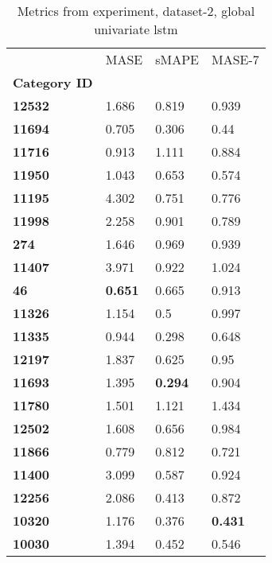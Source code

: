\begin{table}[H]
\centering
\caption{Metrics from experiment, dataset-2, global univariate lstm}
\label{table:global-univariate-lstm-dataset-2}
\begin{tabular}{llll}
\toprule
{} &            MASE &           sMAPE &          MASE-7 \\
\textbf{Category ID} &                 &                 &                 \\
\midrule
\textbf{12532      } &           1.686 &           0.819 &           0.939 \\
\textbf{11694      } &           0.705 &           0.306 &            0.44 \\
\textbf{11716      } &           0.913 &           1.111 &           0.884 \\
\textbf{11950      } &           1.043 &           0.653 &           0.574 \\
\textbf{11195      } &           4.302 &           0.751 &           0.776 \\
\textbf{11998      } &           2.258 &           0.901 &           0.789 \\
\textbf{274        } &           1.646 &           0.969 &           0.939 \\
\textbf{11407      } &           3.971 &           0.922 &           1.024 \\
\textbf{46         } &  \textbf{0.651} &           0.665 &           0.913 \\
\textbf{11326      } &           1.154 &             0.5 &           0.997 \\
\textbf{11335      } &           0.944 &           0.298 &           0.648 \\
\textbf{12197      } &           1.837 &           0.625 &            0.95 \\
\textbf{11693      } &           1.395 &  \textbf{0.294} &           0.904 \\
\textbf{11780      } &           1.501 &           1.121 &           1.434 \\
\textbf{12502      } &           1.608 &           0.656 &           0.984 \\
\textbf{11866      } &           0.779 &           0.812 &           0.721 \\
\textbf{11400      } &           3.099 &           0.587 &           0.924 \\
\textbf{12256      } &           2.086 &           0.413 &           0.872 \\
\textbf{10320      } &           1.176 &           0.376 &  \textbf{0.431} \\
\textbf{10030      } &           1.394 &           0.452 &           0.546 \\
\bottomrule
\end{tabular}
\end{table}
